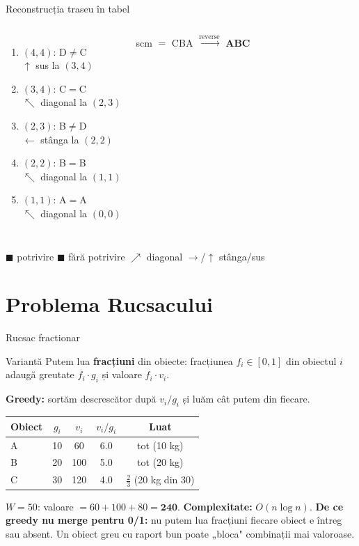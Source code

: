 \documentclass[10pt]{beamer}
\begin{document}
\begin{frame}[fragile]{Reconstrucția \textemdash{} traseu în tabel}
\begin{columns}[c]
    {\footnotesize
    \begin{enumerate}\itemsep3pt
      \item $(4,4)$: D$\neq$C\\$\uparrow$ sus la $(3,4)$
      \item $(3,4)$: C$=$C \checkmark\\$\nwarrow$ diagonal la $(2,3)$
      \item $(2,3)$: B$\neq$D\\$\leftarrow$ stânga la $(2,2)$
      \item $(2,2)$: B$=$B \checkmark\\$\nwarrow$ diagonal la $(1,1)$
      \item $(1,1)$: A$=$A \checkmark\\$\nwarrow$ diagonal la $(0,0)$
    \end{enumerate}
    \smallskip
    scm $= $ CBA $\xrightarrow{\text{reverse}}$ \textbf{ABC}}
  \end{columns}
  \vspace{2pt}
  {\scriptsize
  \textcolor{green!50!black}{$\blacksquare$} potrivire\quad
  \textcolor{yellow!60!black}{$\blacksquare$} fără potrivire\quad
  \textcolor{blue!70!black}{$\nearrow$} diagonal\quad
  \textcolor{gray!70}{$\rightarrow$/$\uparrow$} stânga/sus}
\end{frame}

\section{Problema Rucsacului}

\begin{frame}{Rucsac fractionar}
  \begin{block}{Variantă}
    Putem lua \textbf{fracțiuni} din obiecte: fracțiunea $f_i \in [0,1]$ din obiectul $i$
    adaugă greutate $f_i \cdot g_i$ și valoare $f_i \cdot v_i$.
  \end{block}
  \textbf{Greedy:} sortăm descrescător după $v_i/g_i$ și luăm cât putem din fiecare.
  \begin{center}
  {\small\begin{tabular}{lcccc}
    \toprule
    Obiect & $g_i$ & $v_i$ & $v_i/g_i$ & Luat \\
    \midrule
    A & 10 & 60 & 6.0 & tot (10 kg) \\
    B & 20 & 100 & 5.0 & tot (20 kg) \\
    C & 30 & 120 & 4.0 & $\frac{2}{3}$ (20 kg din 30) \\
    \bottomrule
  \end{tabular}}
  \end{center}
  $W = 50$: valoare $= 60 + 100 + 80 = \mathbf{240}$. \textbf{Complexitate:} $O(n \log n)$.
  \smallskip
  \textbf{De ce greedy nu merge pentru 0/1:} nu putem lua fracțiuni \textemdash{} fiecare
  obiect e întreg sau absent. Un obiect greu cu raport bun poate „bloca" combinații mai valoroase.
\end{frame}
\end{document}
